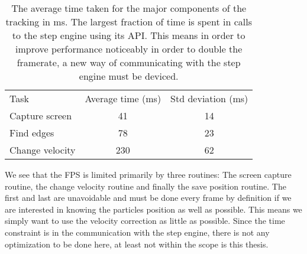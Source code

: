 \begin{table}[H]
 \begin{tabular}{l | c | c } 
 Task  			&  Average time (ms) & Std deviation (ms)\\
 Capture screen & 41 			& 14 \\
 Find edges 	& 78			& 23 \\
 Change velocity& 230			& 62 \\
 \end{tabular}
 
 \caption{The average time taken for the major components of the tracking in ms. The largest fraction of time is spent in calls to the step engine using its API. This means in order to improve performance noticeably in order to double the framerate, a new way of communicating with the step engine must be deviced.}
 \label{tab:benchmarks}
\end{table}

We see that the FPS is limited primarily by three routines: The screen capture routine, the change velocity routine and finally the save position routine. The first and last are unavoidable and must be done every frame by definition if we are interested in knowing the particles position as well as possible. This means we simply want to use the velocity correction as little as possible. Since the time constraint is in the communication with the step engine, there is not any optimization to be done here, at least not within the scope is this thesis. 
